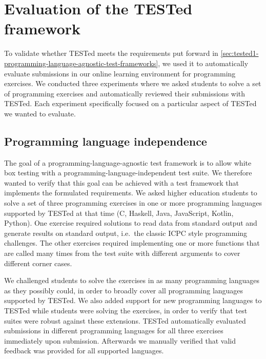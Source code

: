 \documentclass[../main]{subfiles}
\begin{document}
\section{Evaluation of the TESTed framework}\label{sec:tested1-evaluating-tested}

To validate whether TESTed meets the requirements put forward in \cref{sec:tested1-programming-language-agnostic-test-frameworks}, we used it to automatically evaluate submissions in our online learning environment for programming exercises.
We conducted three experiments where we asked students to solve a set of programming exercises and automatically reviewed their submissions with TESTed.
Each experiment specifically focused on a particular aspect of TESTed we wanted to evaluate.

\subsection{Programming language independence}\label{subsec:programming-language-independence}

The goal of a programming-language-agnostic test framework is to allow white box testing with a programming-language-independent test suite.
We therefore wanted to verify that this goal can be achieved with a test framework that implements the formulated requirements.
We asked higher education students to solve a set of three programming exercises in one or more programming languages supported by TESTed at that time (C, Haskell, Java, JavaScript, Kotlin, Python).
One exercise required solutions to read data from standard output and generate results on standard output, i.e.\ the classic ICPC style programming challenges.
The other exercises required implementing one or more functions that are called many times from the test suite with different arguments to cover different corner cases.

We challenged students to solve the exercises in as many programming languages as they possibly could, in order to broadly cover all programming languages supported by TESTed.
We also added support for new programming languages to TESTed while students were solving the exercises, in order to verify that test suites were robust against these extensions.
TESTed automatically evaluated submissions in different programming languages for all three exercises immediately upon submission.
Afterwards we manually verified that valid feedback was provided for all supported languages.
\end{document}
